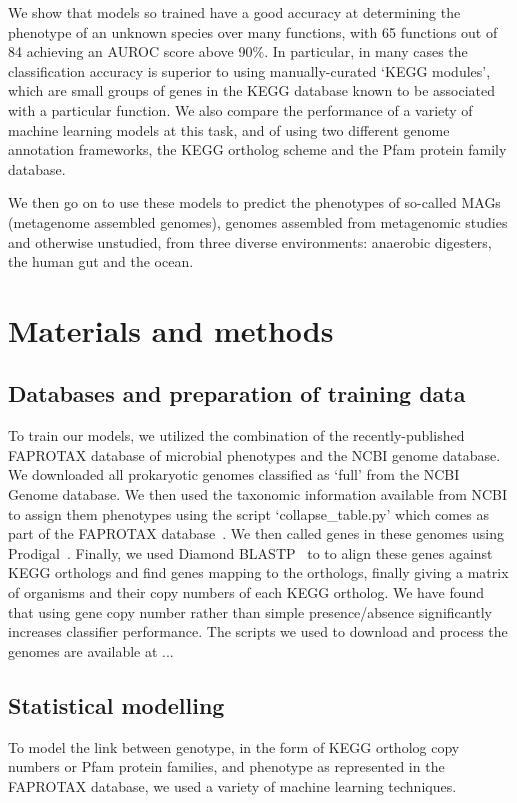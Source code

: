 \documentclass[10pt,letterpaper]{article}
\begin{document}
We show that models so trained have a good accuracy at determining the phenotype of an unknown species over many functions, with 65 functions out of 84 achieving an AUROC score above 90\%. In particular, in many cases the classification accuracy is superior to using manually-curated `KEGG modules', which are small groups of genes in the KEGG database known to be associated with a particular function. We also compare the performance of a variety of machine learning models at this task, and of using two different genome annotation frameworks, the KEGG ortholog scheme and the Pfam protein family database. 

We then go on to use these models to predict the phenotypes of so-called MAGs (metagenome assembled genomes), genomes assembled from metagenomic studies and otherwise unstudied, from three diverse environments: anaerobic digesters, the human gut and the ocean.  


\section*{Materials and methods}
\subsection*{Databases and preparation of training data}
To train our models, we utilized the combination of the recently-published FAPROTAX database of microbial phenotypes and the NCBI genome database. We downloaded all prokaryotic genomes classified as `full' from the NCBI Genome database. We then used the taxonomic information available from NCBI to assign them phenotypes using the script `collapse\_table.py' which comes as part of the FAPROTAX database~\cite{Louca2016}. We then called genes in these genomes using Prodigal~\cite{Hyatt2010}. Finally, we used Diamond BLASTP~\cite{Buchfink2014} to to align these genes against KEGG orthologs and find genes mapping to the orthologs, finally giving a matrix of organisms and their copy numbers of each KEGG ortholog. We have found that using gene copy number rather than simple presence/absence significantly increases classifier performance. The scripts we used to download and process the genomes are available at ...

\subsection*{Statistical modelling}
To model the link between genotype, in the form of KEGG ortholog copy numbers or Pfam protein families, and phenotype as represented in the FAPROTAX database, we used a variety of machine learning techniques.
\end{document}
